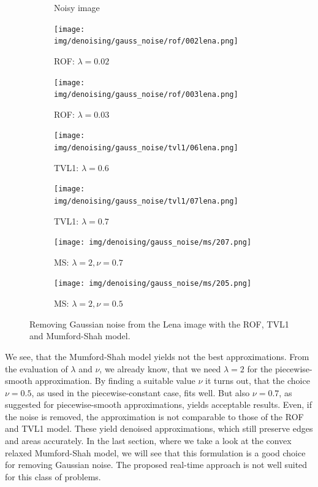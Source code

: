 \documentclass{scrreprt}
\begin{document}
\begin{figure}[!ht]
\begin{subfigure}[b]{0.24\textwidth}
                    \caption{Noisy image}
                \end{subfigure}
                \begin{subfigure}[b]{0.24\textwidth}
                    \texttt{[image: img/denoising/gauss\_noise/rof/002lena.png]}
                    \caption{ROF: $\lambda = 0.02$}
                \end{subfigure}
                \begin{subfigure}[b]{0.24\textwidth}
                    \texttt{[image: img/denoising/gauss\_noise/rof/003lena.png]}
                    \caption{ROF: $\lambda = 0.03$}
                \end{subfigure}
                \begin{subfigure}[b]{0.24\textwidth}
                    \texttt{[image: img/denoising/gauss\_noise/tvl1/06lena.png]}
                    \caption{TVL1: $\lambda = 0.6$}
                \end{subfigure}
                \begin{subfigure}[b]{0.24\textwidth}
                    \texttt{[image: img/denoising/gauss\_noise/tvl1/07lena.png]}
                    \caption{TVL1: $\lambda = 0.7$}
                \end{subfigure}
                \begin{subfigure}[b]{0.24\textwidth}
                    \texttt{[image: img/denoising/gauss\_noise/ms/207.png]}
                    \caption{MS: $\lambda = 2, \nu = 0.7$}
                \end{subfigure}
                \begin{subfigure}[b]{0.24\textwidth}
                    \texttt{[image: img/denoising/gauss\_noise/ms/205.png]}
                    \caption{MS: $\lambda = 2, \nu = 0.5$}
                \end{subfigure}
                \caption[Removing Gaussian noise using the ROF, TVL1 and Mumford-Shah model.]{Removing Gaussian noise from the Lena image with the ROF, TVL1 and Mumford-Shah model.}
            \label{fig:denoising_lena_gauss}
            \end{figure}

        We see, that the Mumford-Shah model yields not the best approximations. From the evaluation of $\lambda$ and $\nu$, we already know, that we need $\lambda = 2$ for the piecewise-smooth approximation. By finding a suitable value $\nu$ it turns out, that the choice $\nu = 0.5$, as used in the piecewise-constant case, fits well. But also $\nu = 0.7$, as suggested for piecewise-smooth approximations, yields acceptable results. Even, if the noise is removed, the approximation is not comparable to those of the ROF and TVL1 model. These yield denoised approximations, which still preserve edges and areas accurately. In the last section, where we take a look at the convex relaxed Mumford-Shah model, we will see that this formulation is a good choice for removing Gaussian noise. The proposed real-time approach is not well suited for this class of problems.
\end{document}
